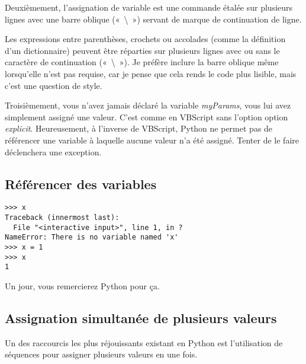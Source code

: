 Deuxièmement, l'assignation de variable est une commande étalée sur plusieurs lignes avec une barre oblique («~\textbackslash~») servant de marque de continuation de ligne.


Les expressions entre parenthèses, crochets ou accolades (comme la définition d'un dictionnaire) peuvent être réparties sur plusieurs lignes avec ou sans le caractère de continuation («~\textbackslash~»). Je préfère inclure la barre oblique même
lorsqu'elle n'est pas requise, car je pense que cela rends le code plus lisible, mais c'est une question de style.

Troisièmement, vous n'avez jamais déclaré la variable \emph{myParams}, vous lui avez simplement assigné une valeur. C'est comme en VBScript sans l'option option \emph{explicit}. Heureusement, à l'inverse de VBScript, Python ne permet pas de référencer une variable à laquelle aucune valeur n'a été assigné. Tenter de le faire déclenchera une exception.

\subsection{Référencer des variables}

\begin{example}
\begin{lstlisting}
>>> x
Traceback (innermost last):
  File "<interactive input>", line 1, in ?
NameError: There is no variable named 'x'
>>> x = 1
>>> x
1
\end{lstlisting}
\end{example}

Un jour, vous remercierez Python pour ça.

\subsection{Assignation simultanée de plusieurs valeurs}

Un des raccourcis les plus réjouissants existant en Python est l'utilisation de séquences pour assigner plusieurs valeurs en une fois.

